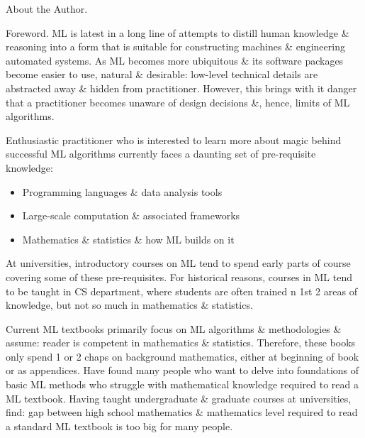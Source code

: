 \documentclass{article}
\begin{document}
\begin{enumerate}
	{\sf About the Author.}
	
	{\sf Foreword.} ML is latest in a long line of attempts to distill human knowledge \& reasoning into a form that is suitable for constructing machines \& engineering automated systems. As ML becomes more ubiquitous \& its software packages become easier to use, natural \& desirable: low-level technical details are abstracted away \& hidden from practitioner. However, this brings with it danger that a practitioner becomes unaware of design decisions \&, hence, limits of ML algorithms.
	
	Enthusiastic practitioner who is interested to learn more about magic behind successful ML algorithms currently faces a daunting set of pre-requisite knowledge:
	\begin{itemize}
		\item Programming languages \& data analysis tools
		\item Large-scale computation \& associated frameworks
		\item Mathematics \& statistics \& how ML builds on it
	\end{itemize}
	At universities, introductory courses on ML tend to spend early parts of course covering some of these pre-requisites. For historical reasons, courses in ML tend to be taught in CS department, where students are often trained n 1st 2 areas of knowledge, but not so much in mathematics \& statistics.
	
	Current ML textbooks primarily focus on ML algorithms \& methodologies \& assume: reader is competent in mathematics \& statistics. Therefore, these books only spend 1 or 2 chaps on background mathematics, either at beginning of book or as appendices. Have found many people who want to delve into foundations of basic ML methods who struggle with mathematical knowledge required to read a ML textbook. Having taught undergraduate \& graduate courses at universities, find: gap between high school mathematics \& mathematics level required to read a standard ML textbook is too big for many people.
	

\end{enumerate}
\end{document}

